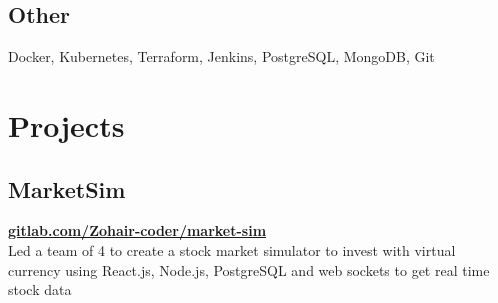 \documentclass[]{deedy-resume-openfont}
\begin{document}
\begin{minipage}[t]{0.33\textwidth}
    \subsection{Other}
    Docker, Kubernetes, Terraform,
    Jenkins, PostgreSQL, MongoDB, Git
    
    
        
        \vspace{\topsep}
        \section {Projects}
        
        \subsection{MarketSim}
        \textbf{\href{https://gitlab.com/Zohair-coder/market-sim}{gitlab.com/Zohair-coder/market-sim}} \\
        \vspace{\topsep}
        Led a team of 4 to create a stock market simulator to invest with virtual currency using React.js, Node.js, PostgreSQL and web sockets to get real time stock data
        
        \vspace{\topsep}
        

\end{minipage}
\end{document}
